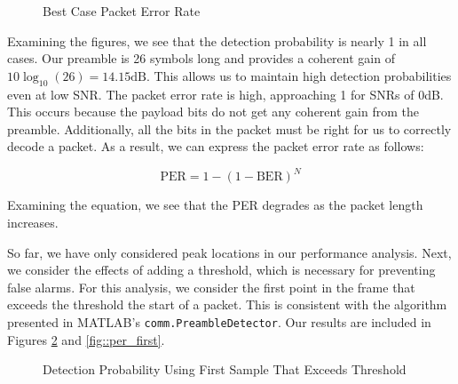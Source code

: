\documentclass{article}
\begin{document}
\begin{figure}[H]
	\centerline{}
	\caption{Best Case Packet Error Rate}
	\label{fig::per_peak}
\end{figure}

\noindent Examining the figures, we see that the detection probability is nearly 1 in all cases. Our preamble is 26 symbols long and provides a coherent gain of $10\log_{10}(26) = 14.15 \text{dB}$. This allows us to maintain high detection probabilities even at low SNR. The packet error rate is high, approaching 1 for SNRs of 0dB. This occurs because the payload bits do not get any coherent gain from the preamble. Additionally, all the bits in the packet must be right for us to correctly decode a packet. As a result, we can express the packet error rate as follows:

\begin{equation*}
	\text{PER} = 1 - (1 - \text{BER})^N
\end{equation*}

\noindent Examining the equation, we see that the PER degrades as the packet length increases.

So far, we have only considered peak locations in our performance analysis. Next, we consider the effects of adding a threshold, which is necessary for preventing false alarms. For this analysis, we consider the first point in the frame that exceeds the threshold the start of a packet. This is consistent with the algorithm presented in MATLAB's \texttt{comm.PreambleDetector}. Our results are included in Figures \ref{fig::detection_probability_first} and \ref{fig::per_first}.

\begin{figure}[H]
	\centerline{}
	\caption{Detection Probability Using First Sample That Exceeds Threshold}
	\label{fig::detection_probability_first}
\end{figure}
\end{document}
